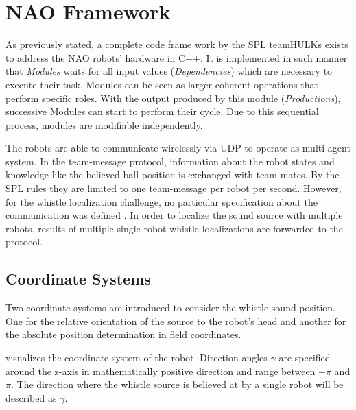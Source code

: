 \section{NAO Framework}
\label{sec:03_naoFramework}

As previously stated, a complete code frame work by the SPL teamHULKs exists to address
the NAO robots' hardware in C++.
It is implemented in such manner that \textit{Modules}   waits for all input
values (\textit{Dependencies}) which are necessary to execute their task.
Modules can be seen as larger coherent operations that perform specific roles.
With the output produced by this module (\textit{Productions}), successive
Modules can start to perform their cycle.
Due to this sequential process, modules are modifiable independently. 

The robots are able to communicate wirelessly via \ac{UDP} to operate as
multi-agent system.
In the team-message protocol, information about the robot states and
knowledge like the believed ball position is exchanged with team mates.
By the \ac{SPL} rules \cite{rules} they are limited to one team-message per
robot per second.
However, for the whistle localization challenge, no particular specification
about the communication was defined \cite{technical_challenge}.
In order to localize the sound source with multiple robots, results of multiple
single robot whistle localizations are forwarded to the protocol.

\subsection{Coordinate Systems}
\label{subsec:03_coordinates}

Two coordinate systems are introduced to consider the whistle-sound position.
One for the relative orientation of the source to the robot's head and another
for the absolute position determination in field coordinates.

 visualizes the coordinate system of the
robot.
Direction angles $\gamma$ are specified around the z-axis in
mathematically positive direction and range between $-\pi$ and $\pi$.
The direction where the whistle source is believed at by a single robot
will be described as $\gamma$.

